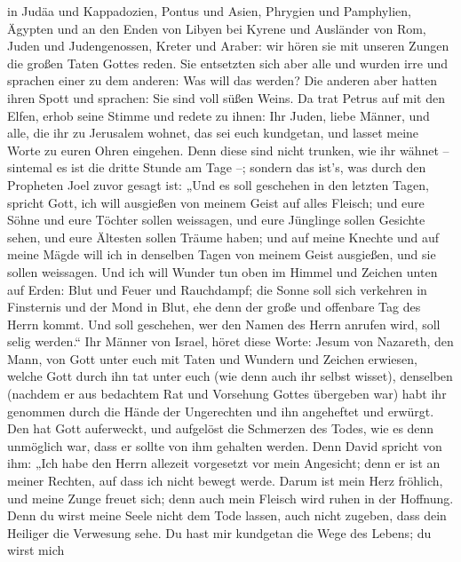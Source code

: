 in Judäa und Kappadozien, Pontus und Asien,  Phrygien und
Pamphylien, Ägypten und an den Enden von Libyen bei Kyrene und Ausländer
von Rom,  Juden und Judengenossen, Kreter und Araber: wir
hören sie mit unseren Zungen die großen Taten Gottes reden.
 Sie entsetzten sich aber alle und wurden irre und sprachen
einer zu dem anderen: Was will das werden?  Die anderen
aber hatten ihren Spott und sprachen: Sie sind voll süßen Weins.
 Da trat Petrus auf mit den Elfen, erhob seine Stimme und
redete zu ihnen: Ihr Juden, liebe Männer, und alle, die ihr zu Jerusalem
wohnet, das sei euch kundgetan, und lasset meine Worte zu euren Ohren
eingehen.  Denn diese sind nicht trunken, wie ihr wähnet --
sintemal es ist die dritte Stunde am Tage --;  sondern das
ist's, was durch den Propheten Joel zuvor gesagt ist:  „Und
es soll geschehen in den letzten Tagen, spricht Gott, ich will ausgießen
von meinem Geist auf alles Fleisch; und eure Söhne und eure Töchter
sollen weissagen, und eure Jünglinge sollen Gesichte sehen, und eure
Ältesten sollen Träume haben;  und auf meine Knechte und
auf meine Mägde will ich in denselben Tagen von meinem Geist ausgießen,
und sie sollen weissagen.  Und ich will Wunder tun oben im
Himmel und Zeichen unten auf Erden: Blut und Feuer und Rauchdampf;
 die Sonne soll sich verkehren in Finsternis und der Mond
in Blut, ehe denn der große und offenbare Tag des Herrn kommt.
 Und soll geschehen, wer den Namen des Herrn anrufen wird,
soll selig werden.``  Ihr Männer von Israel, höret diese
Worte: Jesum von Nazareth, den Mann, von Gott unter euch mit Taten und
Wundern und Zeichen erwiesen, welche Gott durch ihn tat unter euch (wie
denn auch ihr selbst wisset),  denselben (nachdem er aus
bedachtem Rat und Vorsehung Gottes übergeben war) habt ihr genommen
durch die Hände der Ungerechten und ihn angeheftet und erwürgt.
 Den hat Gott auferweckt, und aufgelöst die Schmerzen des
Todes, wie es denn unmöglich war, dass er sollte von ihm gehalten
werden.  Denn David spricht von ihm: „Ich habe den Herrn
allezeit vorgesetzt vor mein Angesicht; denn er ist an meiner Rechten,
auf dass ich nicht bewegt werde.  Darum ist mein Herz
fröhlich, und meine Zunge freuet sich; denn auch mein Fleisch wird ruhen
in der Hoffnung.  Denn du wirst meine Seele nicht dem Tode
lassen, auch nicht zugeben, dass dein Heiliger die Verwesung sehe.
 Du hast mir kundgetan die Wege des Lebens; du wirst mich
